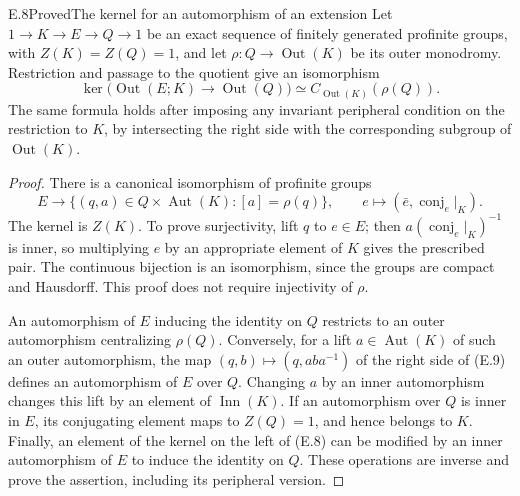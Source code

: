 \begin{result}{E.8}{Proved}{The kernel for an automorphism of an extension}
Let $1\to K\to E\to Q\to1$ be an exact sequence of finitely generated
profinite groups, with $Z(K)=Z(Q)=1$, and let
$\rho:Q\to\operatorname{Out}(K)$ be its outer monodromy.  Restriction
and passage to the quotient give an isomorphism
\[
 \ker\bigl(\operatorname{Out}(E;K)\longrightarrow
                    \operatorname{Out}(Q)\bigr)
       \simeq C_{\operatorname{Out}(K)}(\rho(Q)).             \tag{E.8}
\]
The same formula holds after imposing any invariant peripheral
condition on the restriction to $K$, by intersecting the right side
with the corresponding subgroup of $\operatorname{Out}(K)$.
\end{result}
\begin{proof}
There is a canonical isomorphism of profinite groups
\[
 E\longrightarrow
 \{(q,a)\in Q\times\operatorname{Aut}(K):[a]=\rho(q)\},
 \qquad e\longmapsto (\bar e,\operatorname{conj}_e|_K).
                                                               \tag{E.9}
\]
The kernel is $Z(K)$.  To prove surjectivity, lift $q$ to $e\in E$;
then $a(\operatorname{conj}_e|_K)^{-1}$ is inner, so multiplying $e$
by an appropriate element of $K$ gives the prescribed pair.  The
continuous bijection is an isomorphism, since the groups are compact
and Hausdorff.  This proof does not require injectivity of $\rho$.

An automorphism of $E$ inducing the identity on $Q$ restricts to an
outer automorphism centralizing $\rho(Q)$.  Conversely, for a lift
$a\in\operatorname{Aut}(K)$ of such an outer automorphism, the map
$(q,b)\mapsto(q,aba^{-1})$ of the right side of (E.9) defines an
automorphism of $E$ over $Q$.  Changing $a$ by an inner automorphism
changes this lift by an element of $\operatorname{Inn}(K)$.
If an automorphism over $Q$ is inner in $E$, its conjugating element
maps to $Z(Q)=1$, and hence belongs to $K$.  Finally, an element of
the kernel on the left of (E.8) can be modified by an inner
automorphism of $E$ to induce the identity on $Q$.  These operations
are inverse and prove the assertion, including its peripheral version.
\end{proof}

